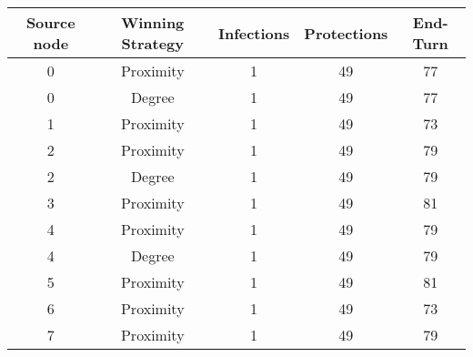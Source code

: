 \documentclass[results.tex]{subfiles}
\begin{document}
    \begin{center}
        \begin{tabular}{| c || c | c | c | c |}
            \hline
            {\bfseries Source node} & {\bfseries Winning Strategy} & {\bfseries Infections} & {\bfseries Protections}
            & {\bfseries End-Turn}
            \\  %
            \hline\hline
            0                       & Proximity                    & 1                      & 49                      & 77                   \\
            \hline
            0                       & Degree                       & 1                      & 49                      & 77                   \\
            \hline
            1                       & Proximity                    & 1                      & 49                      & 73                   \\
            \hline
            2                       & Proximity                    & 1                      & 49                      & 79                   \\
            \hline
            2                       & Degree                       & 1                      & 49                      & 79                   \\
            \hline
            3                       & Proximity                    & 1                      & 49                      & 81                   \\
            \hline
            4                       & Proximity                    & 1                      & 49                      & 79                   \\
            \hline
            4                       & Degree                       & 1                      & 49                      & 79                   \\
            \hline
            5                       & Proximity                    & 1                      & 49                      & 81                   \\
            \hline
            6                       & Proximity                    & 1                      & 49                      & 73                   \\
            \hline
            7                       & Proximity                    & 1                      & 49                      & 79                   \\

\end{tabular}
\end{center}
\end{document}
